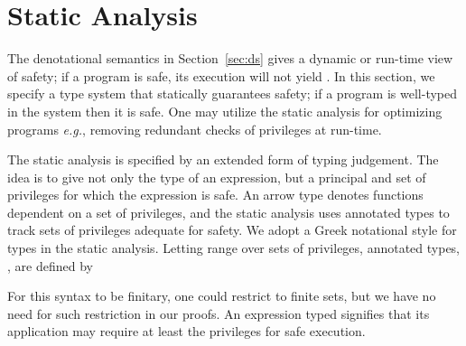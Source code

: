 \documentclass[submission,copyright,creativecommons]{eptcs}
\newcommand{\eg}{{\em e.g.}}
\begin{document}
\section{Static Analysis}
\label{sec:sa}
The denotational semantics in Section~\ref{sec:ds} gives a dynamic or run-time
view of safety; if a program is safe, its execution will not yield .
In this section, we specify a type system that statically 
guarantees safety; if a program is well-typed in the system then it is safe. 
One may utilize the static analysis for optimizing programs \eg, 
removing redundant checks of privileges at run-time.

The static analysis is specified by an extended form of typing judgement.
The idea is to give not only the type of an expression, but a
principal  and set  of privileges for which the expression is
safe.  An arrow type  denotes functions dependent on a
set of privileges, and the static analysis uses annotated types to
track sets of privileges adequate for safety.  We adopt a Greek
notational style for types in the static analysis.  Letting 
range over sets of privileges, annotated types, , are defined by

For this syntax to be finitary, one could restrict  to finite sets, 
but we have no need for such restriction in our proofs.  
An expression typed 
signifies that its application may require at least the privileges  
for safe execution.
\end{document}
